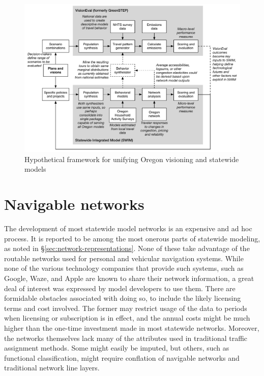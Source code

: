 \begin{figure}
\centering
\includegraphics[width=6.5in]{graphics/42-visioneval-swim-integration}
\caption{Hypothetical framework for unifying Oregon visioning and statewide models}
\label{fig:visioneval-swim}
\end{figure}

\section{Navigable networks}

The development of most statewide model networks is an expensive and ad hoc process. It is reported to be among the most onerous parts of statewide modeling, as noted in \S\ref{sec:network-representations}. None of these take advantage of the routable networks used for personal and vehicular navigation systems. While none of the various technology companies that provide such systems, such as Google, Waze, and Apple are known to share their network information, a great deal of interest was expressed by model developers to use them. There are formidable obstacles associated with doing so, to include the likely licensing terms and cost involved. The former may restrict usage of the data to periods when licensing or subscription is in effect, and the annual costs might be much higher than the one-time investment made in most statewide networks. Moreover, the networks themselves lack many of the attributes used in traditional traffic assignment methods. Some might easily be imputed, but others, such as functional classification, might require conflation of navigable networks and traditional network line layers.

